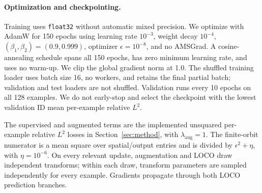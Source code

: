 \paragraph{Optimization and checkpointing.}
Training uses \texttt{float32} without automatic mixed precision.  We optimize with
AdamW for 150 epochs using learning rate \(10^{-3}\), weight decay \(10^{-4}\),
\((\beta_1,\beta_2)=(0.9,0.999)\), optimizer \(\epsilon=10^{-8}\), and no AMSGrad.
A cosine-annealing schedule spans all 150 epochs, has zero minimum learning rate,
and uses no warm-up.  We clip the global gradient norm at 1.0.  The shuffled
training loader uses batch size 16, no workers, and retains the final partial batch;
validation and test loaders are not shuffled.  Validation runs every 10 epochs on
all 128 examples.  We do not early-stop and select the checkpoint with the lowest
validation ID mean per-example relative \(L^2\).

The supervised and augmented terms are the implemented unsquared per-example
relative \(L^2\) losses in Section~\ref{sec:method}, with
\(\lambda_{\mathrm{aug}}=1\).  The finite-orbit numerator is a mean square over
spatial/output entries and is divided by \(\epsilon^2+\eta\), with
\(\eta=10^{-6}\).  On every relevant update, augmentation and LOCO draw independent
transforms; within each draw, transform parameters are sampled independently for
every example.  Gradients propagate through both LOCO prediction branches.

\begin{table}[t]
\centering
\small
\caption{Headline N64 training variants.  At 2\% labels, batches cycle through
sizes 16 and 4.  The transformed-example totals below use the actual partial
batches rather than treating every update as a full batch.}
\label{tab:n64-training-details}
\end{table}

